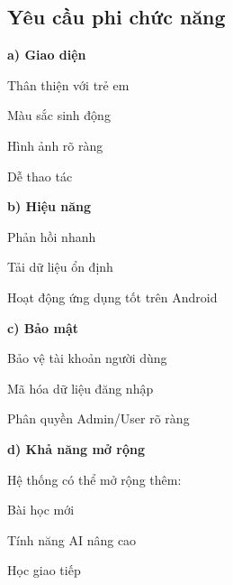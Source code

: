 \subsection{Yêu cầu phi chức năng}

\noindent\textbf{a) Giao diện}


Thân thiện với trẻ em


Màu sắc sinh động


Hình ảnh rõ ràng


Dễ thao tác


\noindent\textbf{b) Hiệu năng}


Phản hồi nhanh


Tải dữ liệu ổn định


Hoạt động ứng dụng tốt trên Android


\noindent\textbf{c) Bảo mật}


Bảo vệ tài khoản người dùng


Mã hóa dữ liệu đăng nhập


Phân quyền Admin/User rõ ràng


\noindent\textbf{d) Khả năng mở rộng}


Hệ thống có thể mở rộng thêm:


Bài học mới


Tính năng AI nâng cao


Học giao tiếp
